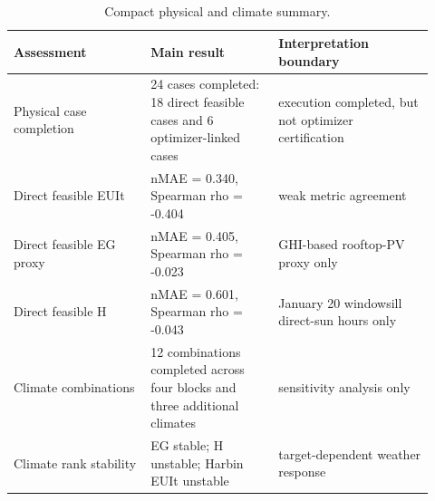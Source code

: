 \subsection{}


\begin{table}[H]
\begin{revblock}
\caption{Compact physical and climate summary.}
\label{tab:physical-climate}
\centering
\scriptsize
\begin{threeparttable}
\begin{tabularx}{\linewidth}{@{}p{0.30\linewidth}p{0.28\linewidth}p{0.34\linewidth}@{}}
\toprule
Assessment & Main result & Interpretation boundary \\
\midrule
Physical case completion & 24 cases completed: 18 direct feasible cases and 6 optimizer-linked cases & execution completed, but not optimizer certification \\
Direct feasible EUIt & nMAE = 0.340, Spearman rho = -0.404 & weak metric agreement \\
Direct feasible EG proxy & nMAE = 0.405, Spearman rho = -0.023 & GHI-based rooftop-PV proxy only \\
Direct feasible H & nMAE = 0.601, Spearman rho = -0.043 & January 20 windowsill direct-sun hours only \\
Climate combinations & 12 combinations completed across four blocks and three additional climates & sensitivity analysis only \\
Climate rank stability & EG stable; H unstable; Harbin EUIt unstable & target-dependent weather response \\
\bottomrule
\end{tabularx}
\end{threeparttable}
\end{revblock}
\end{table}

